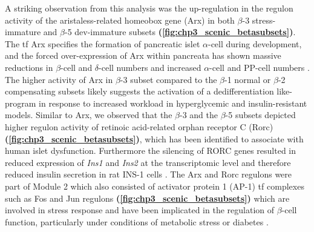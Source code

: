 

\par A striking observation from this analysis was the up-regulation in the regulon activity of the aristaless-related homeobox gene (Arx) in both $\beta$-3 stress-immature and $\beta$-5 dev-immature subsets \textbf{(\autoref{fig:chp3_scenic_betasubsets})}. The \gls{tf} Arx specifies the formation of pancreatic islet $\alpha$-cell during development, and the forced over-expression of Arx within pancreata has shown massive reductions in $\beta$-cell and $\delta$-cell numbers and increased $\alpha$-cell and PP-cell numbers \textbf{\cite{van_der_meulen_role_2015}}. The higher activity of Arx in $\beta$-3 subset compared to the $\beta$-1 normal or $\beta$-2 compensating subsets likely suggests the activation of a dedifferentiation like-program in response to increased workload in hyperglycemic and insulin-resistant models. Similar to Arx, we observed that the $\beta$-3 and the $\beta$-5 subsets depicted higher regulon activity of retinoic acid-related orphan receptor C (Rorc) \textbf{(\autoref{fig:chp3_scenic_betasubsets})}, which has been identified to associate with human islet dysfunction. Furthermore the silencing of RORC genes resulted in reduced expression of \textit{Ins1} and \textit{Ins2} at the transcriptomic level and therefore reduced insulin secretion in rat INS-1 cells \textbf{\cite{taneera_rorb_2019}}. The Arx and Rorc regulons were part of Module 2 which also consisted of activator protein 1 (AP-1) \gls{tf} complexes such as Fos and Jun regulons \textbf{(\autoref{fig:chp3_scenic_betasubsets})} which are involved in stress response and have been implicated in the regulation of $\beta$-cell function, particularly under conditions of metabolic stress or diabetes \textbf{\cite{bahrami_gene_2016,backes_regulation_2021}}.\\



